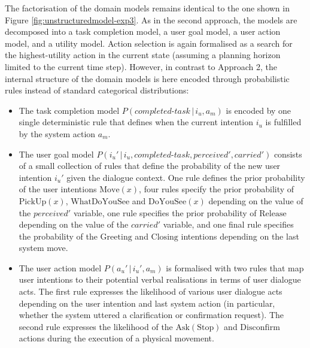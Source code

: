 The factorisation of the domain models remains identical to the one shown in Figure \ref{fig:unstructuredmodel-exp3}.  As in the second approach, the models are decomposed into a task completion model, a user goal model, a user action model, and a utility model.  Action selection is again formalised as a search for the highest-utility action in the current state (assuming a planning horizon limited to the current time step).  However, in contrast to Approach 2, the internal structure of the domain models is here encoded through probabilistic rules instead of standard categorical distributions:
\begin{itemize}
\item The task completion model $P(\mathit{completed\mbox{-}task}\, | \, i_u, a_m)$ is encoded by one single deterministic rule that defines when the current intention $i_u$ is fulfilled by the system action $a_m$. 
\item The user goal model $P(i_u' \, | \, i_u, \mathit{completed\mbox{-}task}, \mathit{perceived'}, \mathit{carried'})$ consists of a small collection of rules that define the probability of the new user intention $i_u'$ given the dialogue context. One rule defines the prior probability of the user intentions $\mathrm{Move(\mathit{x})}$, four rules specify the prior probability of $\mathrm{PickUp(\mathit{x})}$, $\mathrm{WhatDoYouSee}$ and $\mathrm{DoYouSee(\mathit{x})}$ depending on the value of the $\mathit{perceived}'$ variable, one rule specifies the prior probability of $\mathrm{Release}$ depending on the value of the $\mathit{carried}'$ variable, and one final rule specifies the probability of the $\mathrm{Greeting}$ and $\mathrm{Closing}$ intentions depending on the last system move. 

\item The user action model $P(a_u'\, | \, i_u', a_m)$ is formalised with two rules that map user intentions to their potential verbal realisations in terms of user dialogue acts. The first rule expresses the likelihood of various user dialogue acts depending on the user intention and last system action (in particular, whether the system uttered a clarification or confirmation request).  The second rule expresses the likelihood of the $\mathrm{Ask(Stop)}$ and $\mathrm{Disconfirm}$ actions during the execution of a physical movement.


\end{itemize}
